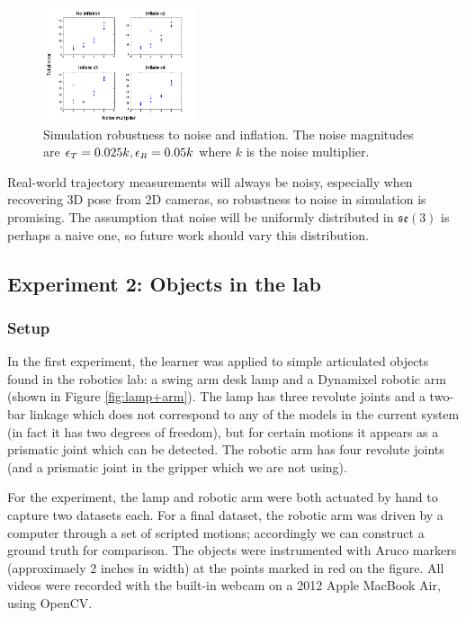 \documentclass[letterpaper, 10 pt, conference]{ieeeconf}  %
\begin{document}
\begin{figure}[ht]
  \centering
  \includegraphics[width=0.4\textwidth]{img/exp1.png}
  \vspace{-.3in}
  \caption{Simulation robustness to noise and inflation. The noise magnitudes are $\epsilon_{\mbox{\tiny $T$}}=0.025k, \epsilon_{\mbox{\tiny $R$}}=0.05k$ where $k$ is the noise multiplier.}
  \label{fig:exp1}
\end{figure}

Real-world trajectory measurements will always be noisy, especially when recovering 3D pose from 2D cameras, so robustness to noise in simulation is promising. The assumption that noise will be uniformly distributed in $\mathfrak{se}(3)$ is perhaps a naive one, so future work should vary this distribution.

\subsection{Experiment 2: Objects in the lab}
\subsubsection{Setup}
In the first experiment, the learner was applied to simple articulated objects found in the robotics lab: a swing arm desk lamp and a Dynamixel robotic arm (shown in Figure \ref{fig:lamp+arm}). The lamp has three revolute joints and a two-bar linkage which does not correspond to any of the models in the current system (in fact it has two degrees of freedom), but for certain motions it appears as a prismatic joint which can be detected. The robotic arm has four revolute joints (and a prismatic joint in the gripper which we are not using).

For the experiment, the lamp and robotic arm were both actuated by hand to capture two datasets each. For a final dataset, the robotic arm was driven by a computer through a set of scripted motions; accordingly we can construct a ground truth for comparison. The objects were instrumented with Aruco markers (approximaely 2 inches in width) at the points marked in red on the figure. All videos were recorded with the built-in webcam on a 2012 Apple MacBook Air, using OpenCV.
\end{document}
